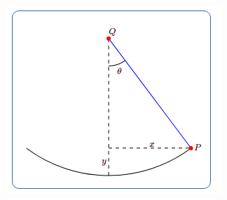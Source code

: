 \documentclass[11pt,reqno]{article}
\theoremstyle{definition}
\begin{document}
\begin{enumerate}
		\begin{figure}[h!]
			\includegraphics[scale=0.8]{Capture.PNG}
		\end{figure}
		
	
	\end{enumerate}
	
	
\end{document}
